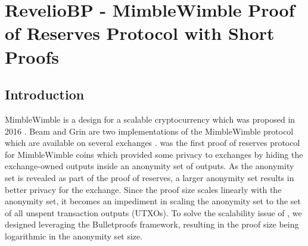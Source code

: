 \chapter{\textnormal{{\selectfont RevelioBP}} - MimbleWimble Proof of Reserves Protocol with Short Proofs}
\label{chap:revBP}

\section{Introduction}

MimbleWimble is a design for a scalable cryptocurrency which was proposed in 2016 \cite{Jedusor2016}. Beam and Grin are two implementations of the MimbleWimble protocol which are available on several exchanges \cite{Coinmarketcap}. \R \cite{Dutta2019b} was the first proof of reserves protocol for MimbleWimble coins which provided some privacy to exchanges by hiding the exchange-owned outputs inside an anonymity set of outputs. As the anonymity set is revealed as part of the proof of reserves, a larger anonymity set results in better privacy for the exchange. Since the \R proof size scales linearly with the anonymity set, it becomes an impediment in scaling the anonymity set to the set of all unspent transaction outputs (UTXOs).
To solve the scalability issue of \Rw, we designed \RB leveraging the Bulletproofs \cite{Bunz2018} framework, resulting in the proof size being logarithmic in the anonymity set size.\\[-6pt]   

